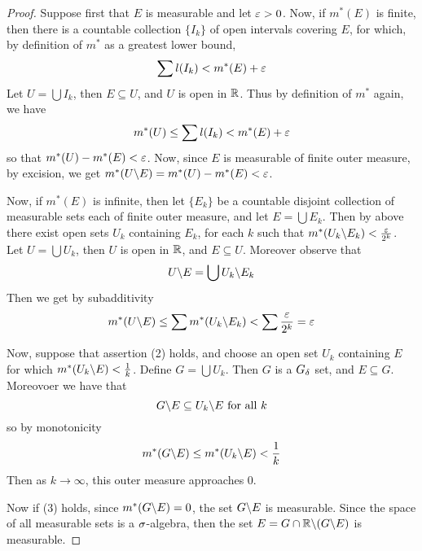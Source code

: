 \begin{proof}
    Suppose first that $E$ is measurable and let  $\varepsilon>0$. Now, if  $m^\ast(E)$
    is finite, then there is a countable collection $\{I_k\}$ of open intervals
    covering $E$, for which, by definition of  $m^\ast$ as a greatest lower
    bound,
    \begin{equation*}
        \sum{l(I_k)}<m^\ast(E)+\varepsilon
    \end{equation*}
    Let $U=\bigcup{I_k}$, then $E \subseteq U$, and  $U$ is open in  $\mathbb{R}$. Thus
    by definition of  $m^\ast$ again, we have
    \begin{equation*}
        m^\ast(U) \leq \sum{l(I_k)}<m^\ast(E)+\varepsilon
    \end{equation*}
    so that $m^\ast(U)-m^\ast(E)<\varepsilon$. Now, since $E$ is measurable of finite
    outer measure, by excision, we get
    $m^\ast(U\backslash E)=m^\ast(U)-m^\ast(E)<\varepsilon$.

    Now, if $m^\ast(E)$ is infinite, then let $\{E_k\}$ be a countable disjoint
    collection of measurable sets each of finite outer measure, and let
    $E=\bigcup{E_k}$. Then by above there exist open sets $U_k$ containing
    $E_k$, for each  $k$ such that  $m^\ast(U_k\backslash E_k)<\frac{\varepsilon}{2^k}$. Let
    $U=\bigcup{U_k}$, then $U$ is open in  $\mathbb{R}$, and  $E \subseteq U$. Moreover
    observe that
    \begin{equation*}
        U\backslash E=\bigcup{U_k\backslash E_k}
    \end{equation*}
    Then we get by subadditivity
    \begin{equation*}
        m^\ast(U\backslash E) \leq
        \sum{m^\ast(U_k\backslash E_k)}<\sum{\frac{\varepsilon}{2^k}}=\varepsilon
    \end{equation*}

    Now, suppose that assertion (2) holds, and choose an open set $U_k$ containing
     $E$ for which  $m^\ast(U_k\backslash E)<\frac{1}{k}$. Define $G=\bigcup{U_k}$.
     Then $G$ is a  $G_\delta$ set, and  $E \subseteq G$. Moreovoer we have that
     \begin{equation*}
         G\backslash E \subseteq U_k\backslash E \text{ for all } k
     \end{equation*}
     so by monotonicity
     \begin{equation*}
         m^\ast(G\backslash E) \leq m^\ast(U_k\backslash E)<\frac{1}{k}
     \end{equation*}
     Then as $k \xrightarrow{} \infty$, this outer measure approaches $0$.

     Now if (3) holds, since $m^\ast(G\backslash E)=0$, the set $ G\backslash E$ is
     measurable. Since the space of all measurable sets is a $\sigma$-algebra, then
     the set $E=G \cap \mathbb{R}\backslash(G\backslash E)$ is measurable.
\end{proof}

